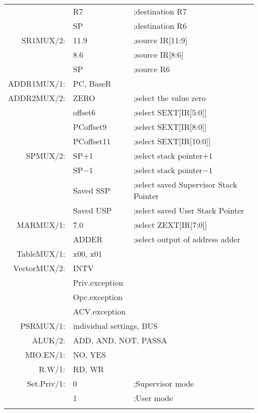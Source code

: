 \documentclass{patt}
\begin{document}
\begin{table}
{\begin{tabular}{@{\hspace{6pt}}rll@{}}
     & R7 &          ;destination R7\\
     & SP &          ;destination R6\\
SR1MUX/2:\rule[0mm]{0mm}{5mm} & 11.9 & ;source IR[11:9]\\
     & 8.6 &         ;source IR[8:6]\\
     & SP  &         ;source R6\\
ADDR1MUX/1:\rule[0mm]{0mm}{5mm} & \multicolumn{2}{l}{PC, BaseR}\\
ADDR2MUX/2:\rule[0mm]{0mm}{5mm} & ZERO & ;select the value zero\\
     & offset6 &     ;select SEXT[IR[5:0]]\\
     & PCoffset9 &   ;select SEXT[IR[8:0]]\\
     & PCoffset11 &  ;select SEXT[IR[10:0]]\\
SPMUX/2:\rule[0mm]{0mm}{5mm} & SP+1 & ;select stack pointer+1\\
     & SP$-$1 &      ;select stack pointer$-$1\\
     & Saved SSP & ;select saved Supervisor Stack Pointer\\
     & Saved USP & ;select saved User Stack Pointer\\
MARMUX/1:\rule[0mm]{0mm}{5mm} & 7.0 &      ;select ZEXT[IR[7:0]]\\
     & ADDER &      ;select output of address adder\\
TableMUX/1:\rule[0mm]{0mm}{5mm} & \multicolumn{2}{l}{x00, x01}\\
VectorMUX/2:\rule[0mm]{0mm}{5mm} & INTV & \\
        & Priv.exception & \\
        & Opc.exception & \\
        & ACV.exception & \\
PSRMUX/1:\rule[0mm]{0mm}{5mm} & \multicolumn{2}{l}{individual settings, BUS}\\
ALUK/2:\rule[0mm]{0mm}{5mm} & \multicolumn{2}{l}{ADD, AND, NOT, PASSA}\\
MIO.EN/1:\rule[0mm]{0mm}{5mm} & \multicolumn{2}{l}{NO, YES}\\
R.W/1:     & \multicolumn{2}{l}{RD, WR}\\
Set.Priv/1:\rule[0mm]{0mm}{5mm} & 0 & ;Supervisor mode\\
        & 1 &  ;User mode\\
\botrule
\end{tabular}}{}
\label{tab:datapathcontrol}
\end{table}
\end{document}
